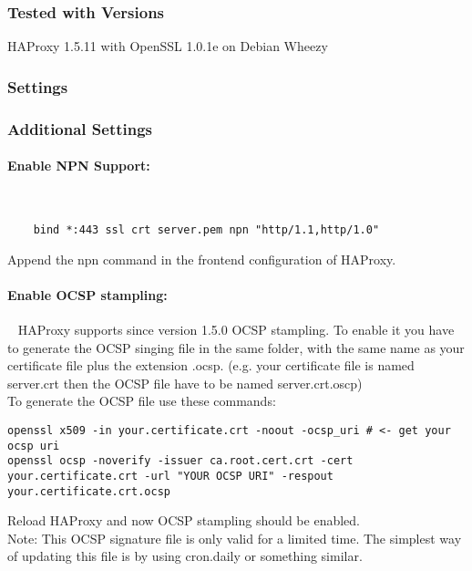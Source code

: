 \subsubsection{Tested with Versions}
\begin{itemize*}
  \item HAProxy 1.5.11 with OpenSSL 1.0.1e on Debian Wheezy
\end{itemize*}

\subsubsection{Settings}

\subsubsection{Additional Settings}
\paragraph*{Enable \ac{NPN} Support:}
~
\begin{lstlisting}
	bind *:443 ssl crt server.pem npn "http/1.1,http/1.0"
\end{lstlisting}
Append the npn command in the frontend configuration of HAProxy.

\paragraph*{Enable OCSP stampling:}
~
HAProxy supports since version 1.5.0 OCSP stampling. To enable it you have to generate the OCSP singing file in the same folder, with the same name as your certificate file plus the extension .ocsp. (e.g. your certificate file is named server.crt then the OCSP file have to be named server.crt.oscp)\\
To generate the OCSP file use these commands:
\begin{lstlisting}
openssl x509 -in your.certificate.crt -noout -ocsp_uri # <- get your ocsp uri
openssl ocsp -noverify -issuer ca.root.cert.crt -cert your.certificate.crt -url "YOUR OCSP URI" -respout your.certificate.crt.ocsp
\end{lstlisting}
Reload HAProxy and now OCSP stampling should be enabled.\\
Note: This OCSP signature file is only valid for a limited time. The simplest way of updating this file is by using cron.daily or something similar.


